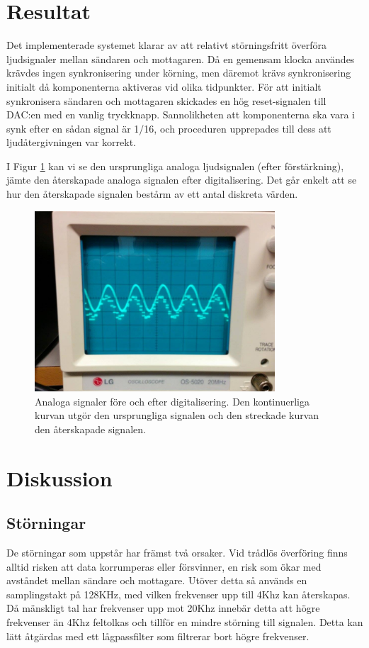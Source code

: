 \documentclass[a4paper,10pt]{article}
\begin{document}
\section{Resultat}

Det implementerade systemet klarar av att relativt störningsfritt överföra 
ljudsignaler mellan sändaren och mottagaren. Då en gemensam klocka användes 
krävdes ingen synkronisering under körning, men däremot krävs synkronisering 
initialt då komponenterna aktiveras vid olika tidpunkter. För att initialt 
synkronisera sändaren och mottagaren skickades en hög reset-signalen till DAC:en 
med en vanlig tryckknapp. Sannolikheten att komponenterna ska vara i synk efter 
en sådan signal är 1/16, och proceduren upprepades till dess att 
ljudåtergivningen var korrekt. 

I Figur \ref{oscilloskop} kan vi se den ursprungliga analoga ljudsignalen (efter 
förstärkning), jämte den återskapade analoga signalen efter digitalisering. Det 
går enkelt att se hur den återskapade signalen bestårm av ett antal diskreta 
värden.


\begin{figure}
\centering
\includegraphics[width=0.8\textwidth]{oscilloskop.jpg}
\caption{Analoga signaler före och efter digitalisering. Den kontinuerliga 
         kurvan utgör den ursprungliga signalen och den streckade kurvan den 
	 återskapade signalen.}
\label{oscilloskop}
\end{figure}


\section{Diskussion}
\subsection{Störningar}
De störningar som uppstår har främst två orsaker. Vid trådlös överföring finns 
alltid risken att data korrumperas eller försvinner, en risk som ökar med 
avståndet mellan sändare och mottagare. Utöver detta så används en samplingstakt 
på 128KHz, med vilken frekvenser upp till 4Khz kan återskapas. Då mänskligt tal 
har frekvenser upp mot 20Khz innebär detta att högre frekvenser än 4Khz 
feltolkas och tillför en mindre störning till signalen. Detta kan lätt åtgärdas 
med ett lågpassfilter som filtrerar bort högre frekvenser.
\end{document}
